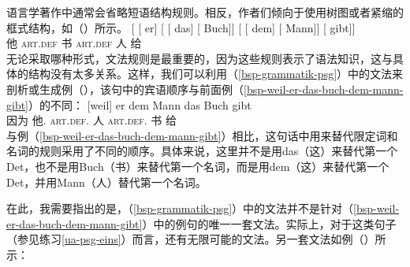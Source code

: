 语言学著作中通常会省略短语结构规则。相反，作者们倾向于使用树图或者紧缩的框式结构，如（）所示。
\ea
\gll {}[ [ er] [ [ das] [ Buch]]  [ [ dem] [ Mann]] [ gibt]]\\
     {}         {}       他  {}        {}       \textsc{art}.\textsc{def}  {}      书    {}        {}       \textsc{art}.\textsc{def}  {}       人     {}      给\\  
\z
无论采取哪种形式，文法规则是最重要的，因为这些规则表示了语法知识，这与具体的结构没有太多关系。这样，我们可以利用（\ref{bsp-grammatik-psg}）中的文法来剖析或生成例（），该句中的宾语顺序与前面例（\ref{bsp-weil-er-das-buch-dem-mann-gibt}）的不同：
\ea
\gll {}[weil] er dem Mann das Buch gibt\\
	 {}\spacebr{}因为 他.\nom{} \textsc{art}.\textsc{def}.\dat{} 人 \textsc{art}.\textsc{def}.\acc{} 书 给\\
\z
与例（\ref{bsp-weil-er-das-buch-dem-mann-gibt}）相比，这句话中用来替代限定词和名词的规则采用了不同的顺序。具体来说，这里并不是用das（这）来替代第一个Det，也不是用Buch（书）来替代第一个名词，而是用dem（这）来替代第一个Det，并用Mann（人）替代第一个名词。

在此，我需要指出的是，（\ref{bsp-grammatik-psg}）中的文法并不是针对（\ref{bsp-weil-er-das-buch-dem-mann-gibt}）中的例句的唯一一套文法。实际上，对于这类句子（参见练习\ref{ua-psg-eins}）而言，还有无限\label{page-unendlich-viele-grammatiken}可能的文法。另一套文法如例（）所示：

